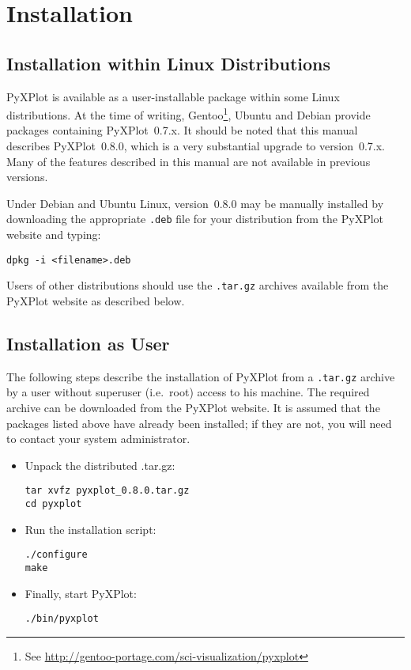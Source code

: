 \section{Installation}

\subsection{Installation within Linux Distributions}

PyXPlot is available as a user-installable package within some Linux
distributions. At the time of writing, Gentoo\footnote{See
\url{http://gentoo-portage.com/sci-visualization/pyxplot}}, Ubuntu and Debian provide packages containing
PyXPlot~0.7.x. It should be noted that this manual describes PyXPlot~0.8.0,
which is a very substantial upgrade to version~0.7.x. Many of the features
described in this manual are not available in previous versions.

Under Debian and Ubuntu Linux, version~0.8.0 may be manually installed by
downloading the appropriate {\tt .deb} file for your distribution from the
PyXPlot website and typing:

\begin{verbatim}
dpkg -i <filename>.deb
\end{verbatim}

Users of other distributions should use the {\tt .tar.gz} archives available
from the PyXPlot website as described below.

\subsection{Installation as User}

The following steps describe the installation of PyXPlot from a {\tt .tar.gz}
archive by a user without superuser (i.e.\ root) access to his machine. The
required archive can be downloaded from the PyXPlot website. It is assumed that
the packages listed above have already been installed; if they are not, you
will need to contact your system administrator.

\begin{itemize}
\item Unpack the distributed .tar.gz:

\begin{verbatim}
tar xvfz pyxplot_0.8.0.tar.gz
cd pyxplot
\end{verbatim}

\item Run the installation script:

\begin{verbatim}
./configure
make
\end{verbatim}

\item Finally, start PyXPlot:

\begin{verbatim}
./bin/pyxplot
\end{verbatim}

\end{itemize}

